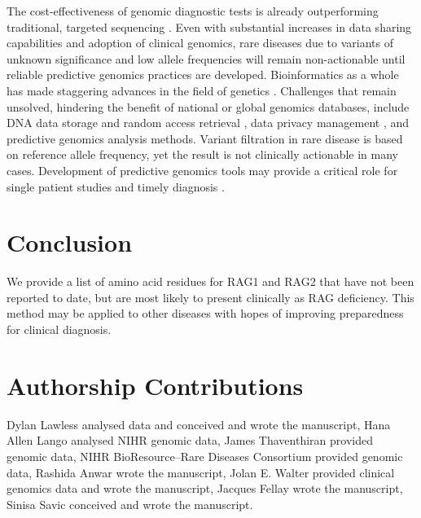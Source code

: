 \documentclass[preprint,11pt,fleqn]{elsarticle}
\begin{document}
The cost-effectiveness of genomic diagnostic tests is already outperforming traditional, targeted sequencing \citep{payne2018cost}. 
Even with substantial increases in data sharing capabilities and adoption of clinical genomics, rare diseases due to variants of unknown significance and low allele frequencies will remain non-actionable until reliable predictive genomics practices are developed. 
Bioinformatics as a whole has made staggering advances in the field of genetics 
\citep{libbrecht2015machine}. 
Challenges that remain unsolved, hindering the benefit of national or global genomics databases, include DNA data storage and random access retrieval 
\citep{Organick114553}, 
data privacy management 
\citep{Huang:224980}, 
and predictive genomics analysis methods. 
Variant filtration in rare disease is based on reference allele frequency, yet the result is not clinically actionable in many cases. 
Development of predictive genomics tools may provide a critical role for single patient studies and timely diagnosis \citep{casanova2014guidelines}. 


\section*{Conclusion}
\noindent We provide a list of amino acid residues for RAG1 and RAG2 that have not been reported to date, but are most likely to present clinically as RAG deficiency. 
This method may be applied to other diseases with hopes of improving preparedness for clinical diagnosis.


\section*{Authorship Contributions}
\noindent Dylan Lawless analysed data and conceived and wrote the manuscript, 
Hana Allen Lango analysed NIHR genomic data, 
James Thaventhiran provided genomic data, 
NIHR BioResource–Rare Diseases Consortium provided genomic data, 
Rashida Anwar wrote the manuscript, 
Jolan E. Walter provided clinical genomics data and wrote the manuscript, 
Jacques Fellay wrote the manuscript, 
Sinisa Savic conceived and wrote the manuscript.

\end{document}
